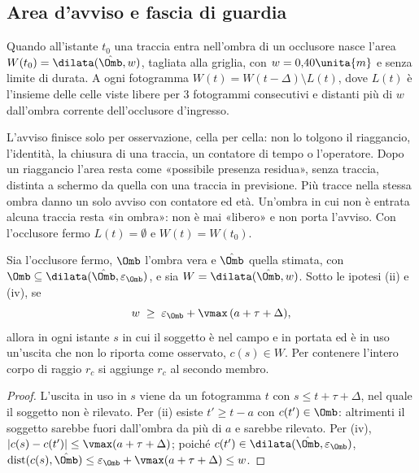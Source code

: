 \subsection{Area d'avviso e fascia di guardia}\label{sec:occ-avviso}

\begin{definizione}\label{def:occ-avviso}
Quando all'istante $t_0$ una traccia entra nell'ombra di un occlusore nasce l'area $W(t_0)=\dilata(\hat\Omb,w)$, tagliata alla griglia, con $w=0{,}40\unita{m}$ e senza limite di durata. A ogni fotogramma $W(t)=W(t-\Delta)\setminus L(t)$, dove $L(t)$ è l'insieme delle celle viste libere per 3 fotogrammi consecutivi e distanti più di $w$ dall'ombra corrente dell'occlusore d'ingresso.
\end{definizione}

L'avviso finisce solo per osservazione, cella per cella: non lo tolgono il riaggancio, l'identità, la chiusura di una traccia, un contatore di tempo o l'operatore. Dopo un riaggancio l'area resta come «possibile presenza residua», senza traccia, distinta a schermo da quella con una traccia in previsione. Più tracce nella stessa ombra danno un solo avviso con contatore ed età. Un'ombra in cui non è entrata alcuna traccia resta «in ombra»: non è mai «libero» e non porta l'avviso. Con l'occlusore fermo $L(t)=\emptyset$ e $W(t)=W(t_0)$.

\begin{proposizione}\label{prop:occ-fascia}
Sia l'occlusore fermo, $\Omb$ l'ombra vera e $\hat\Omb$ quella stimata, con $\Omb\subseteq\dilata(\hat\Omb,\varepsilon_\Omb)$, e sia $W=\dilata(\hat\Omb,w)$. Sotto le ipotesi (ii) e (iv), se
\begin{equation}\label{eq:occ-fascia}
w\;\ge\;\varepsilon_\Omb+\vmax\,(a+\tau+\Delta),
\end{equation}
allora in ogni istante $s$ in cui il soggetto è nel campo e in portata ed è in uso un'uscita che non lo riporta come osservato, $c(s)\in W$. Per contenere l'intero corpo di raggio $r_c$ si aggiunge $r_c$ al secondo membro. 
\end{proposizione}
\begin{proof}
L'uscita in uso in $s$ viene da un fotogramma $t$ con $s\le t+\tau+\Delta$, nel quale il soggetto non è rilevato. Per (ii) esiste $t'\ge t-a$ con $c(t')\in\Omb$: altrimenti il soggetto sarebbe fuori dall'ombra da più di $a$ e sarebbe rilevato. Per (iv), $|c(s)-c(t')|\le\vmax(a+\tau+\Delta)$; poiché $c(t')\in\dilata(\hat\Omb,\varepsilon_\Omb)$, $\operatorname{dist}(c(s),\hat\Omb)\le\varepsilon_\Omb+\vmax(a+\tau+\Delta)\le w$.
\end{proof}

